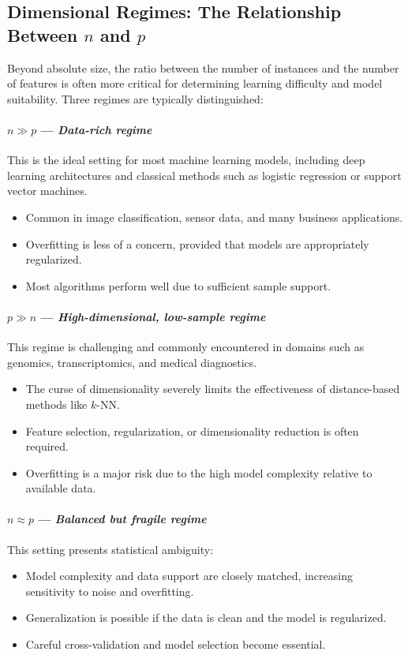 \documentclass[12pt,openany, draft]{book}
\begin{document}
\subsection{Dimensional Regimes: The Relationship Between \(n\) and \(p\)}

Beyond absolute size, the ratio between the number of instances and the number of features is often more critical for determining learning difficulty and model suitability. Three regimes are typically distinguished:

\paragraph{\(n \gg p\) --- \textit{Data-rich regime}}
This is the ideal setting for most machine learning models, including deep learning architectures and classical methods such as logistic regression or support vector machines.
\begin{itemize}
    \item Common in image classification, sensor data, and many business applications.
    \item Overfitting is less of a concern, provided that models are appropriately regularized.
    \item Most algorithms perform well due to sufficient sample support.
\end{itemize}

\paragraph{\(p \gg n\) --- \textit{High-dimensional, low-sample regime}}
This regime is challenging and commonly encountered in domains such as genomics, transcriptomics, and medical diagnostics.
\begin{itemize}
    \item The curse of dimensionality severely limits the effectiveness of distance-based methods like \(k\)-NN.
    \item Feature selection, regularization, or dimensionality reduction is often required.
    \item Overfitting is a major risk due to the high model complexity relative to available data.
\end{itemize}

\paragraph{\(n \approx p\) --- \textit{Balanced but fragile regime}}
This setting presents statistical ambiguity:
\begin{itemize}
    \item Model complexity and data support are closely matched, increasing sensitivity to noise and overfitting.
    \item Generalization is possible if the data is clean and the model is regularized.
    \item Careful cross-validation and model selection become essential.
\end{itemize}
\end{document}
